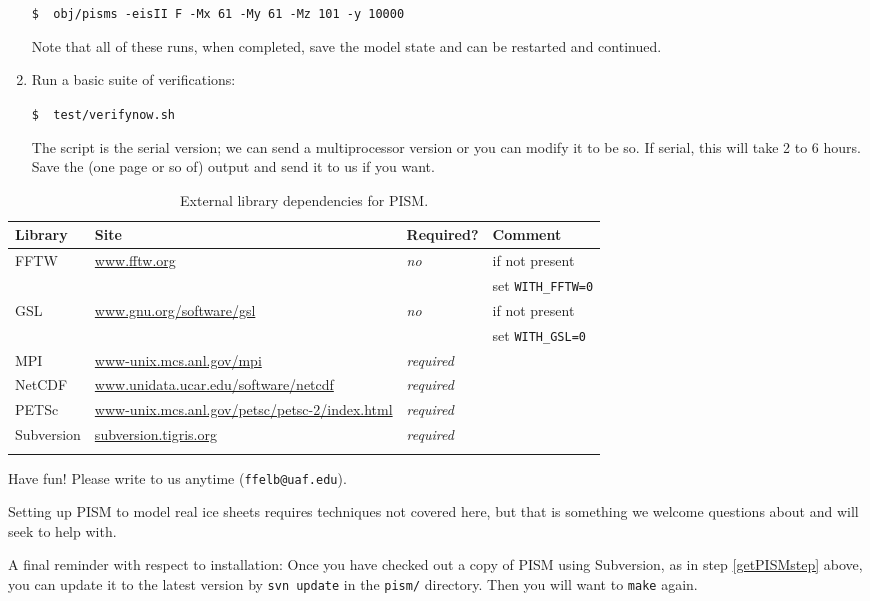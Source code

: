 \documentclass[11pt,final]{amsart}
\begin{document}
\begin{enumerate}
\verb|$  obj/pisms -eisII F -Mx 61 -My 61 -Mz 101 -y 10000|

\noindent Note that all of these runs, when completed, save the model state and can be restarted and continued.
\item Run a basic suite of verifications:

\verb|$  test/verifynow.sh|

\noindent The script is the serial version; we can send a multiprocessor version or you can modify it to be so.  If serial, this will take 2 to 6 hours.  Save the (one page or so of) output and send it to us if you want.
\end{enumerate}

\begin{table}
\caption{External library dependencies for PISM.}\label{tab:PISMdepends}
\begin{tabular}{@{}llll}\hline
\small
\textbf{Library} & \textbf{Site} & \textbf{Required?} & \textbf{Comment} \\ \hline
FFTW & \url{www.fftw.org} & \emph{no} & if not present  \\
 & & & \quad set \verb|WITH_FFTW=0| \\
GSL & \url{www.gnu.org/software/gsl} & \emph{no} &  if not present \\
 & & & \quad set \verb|WITH_GSL=0| \\
MPI & \url{www-unix.mcs.anl.gov/mpi} & \emph{required} & \\
NetCDF & \url{www.unidata.ucar.edu/software/netcdf} & \emph{required} & \\
PETSc & \url{www-unix.mcs.anl.gov/petsc/petsc-2/index.html} & \emph{required} & \\
Subversion & \url{subversion.tigris.org} & \emph{required} & \\
\hline
\normalsize
\end{tabular}
\end{table}

Have fun!  Please write to us anytime (\verb|ffelb@uaf.edu|).

Setting up PISM to model real ice sheets requires techniques not covered here, but that is something we welcome questions about and will seek to help with.

A final reminder with respect to installation:  Once you have checked out a copy of PISM using Subversion, as in step \ref{getPISMstep} above, you can update it to the latest version by \verb|svn update| in the \verb|pism/| directory.  Then you will want to \verb|make| again.
\end{document}
